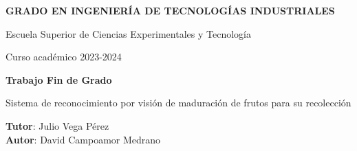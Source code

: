 \thispagestyle{empty}
\vspace{2cm}

\begin{figure}[htb]
  \centerline{}
\end{figure}

\begin{center}
  {\Large {\bf GRADO EN INGENIERÍA DE TECNOLOGÍAS INDUSTRIALES}}
  \vspace{5mm}
 
  {\large {Escuela Superior de Ciencias Experimentales y Tecnología}}
  \vspace{5mm}

  {\large {Curso académico 2023-2024}}

  \vspace{1cm}

  {\large {\bf Trabajo Fin de Grado}}

  \vspace{2cm}

  {\Large {Sistema de reconocimiento por visión de maduración de frutos para su recolección\\ [1cm] }}

  \vspace{5cm}
  {\bf Tutor}: Julio Vega Pérez \\
  {\bf Autor}: David Campoamor Medrano
\end{center}

\clearpage
\thispagestyle{empty}
